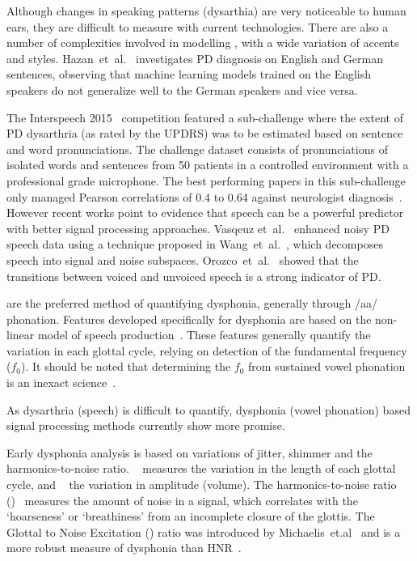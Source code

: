 \documentclass[12pt, twoside]{book}
\renewcommand\emph[1]{\textit{\color{USred}{#1}}}
\begin{document}
Although changes in speaking patterns (dysarthia) are very noticeable to human ears, they are difficult to measure with current technologies. There are also a number of complexities involved in modelling \emph{spoken language}, with a wide variation of accents and styles. Hazan~et~al.~\cite{hazan2012} investigates PD diagnosis on English and German sentences, observing that machine learning models trained on the English speakers do not generalize well to the German speakers and vice versa. 

The Interspeech 2015~\cite{compareis15pd} competition featured a sub-challenge where the extent of PD dysarthria (as rated by the UPDRS) was to be estimated based on sentence and word pronunciations. The challenge dataset consists of pronunciations of isolated words and sentences from 50 patients in a controlled environment with a professional grade microphone. The best performing papers in this sub-challenge only managed Pearson correlations of 0.4 to 0.64 against neurologist diagnosis~\cite{hahm2015parkinson,grosz2015assessingis15,williamson2015segment}.
However recent works point to evidence that speech can be a powerful predictor with better signal processing approaches. Vasqeuz et~al.~\cite{vasquez2015automatic} enhanced noisy PD speech data using a technique proposed in Wang~et~al.~\cite{wang2007speechenhancement}, which decomposes speech into signal and noise subspaces. Orozco~et~al.~\cite{orozco2015voiced} showed that the transitions between voiced and unvoiced speech is a strong indicator of PD.

\emph{Sustained vowel phonations} are the preferred method of quantifying dysphonia, generally through /aa/ phonation. Features developed specifically for dysphonia are based on the non-linear model of speech production~\cite{splittledysphonia2009, splittlenonlinear2007}. These features generally quantify the variation in each glottal cycle, relying on detection of the fundamental frequency ($f_0$). It should be noted that determining the $f_0$ from sustained vowel phonation is an inexact science~\cite{f0estimation}.

\begin{highlight}
As dysarthria (speech) is difficult to quantify, dysphonia (vowel phonation) based signal processing methods currently show more promise.
\end{highlight}

Early dysphonia analysis is based on variations of jitter, shimmer and the harmonics-to-noise ratio. \emph{Jitter}~ measures the variation in the length of each glottal cycle, and \emph{shimmer}~\cite{shimmerjitter,jittertime} the variation in amplitude (volume). The harmonics-to-noise ratio (\emph{HNR})~\cite{HNRintro} measures the amount of noise in a signal, which correlates with the `hoarseness' or `breathiness' from an incomplete closure of the glottis.  The Glottal to Noise Excitation (\emph{GNE}) ratio was introduced by Michaelis~et.al~\cite{gne} and is a more robust measure of dysphonia than HNR~\cite{gneratio}. 
\end{document}
